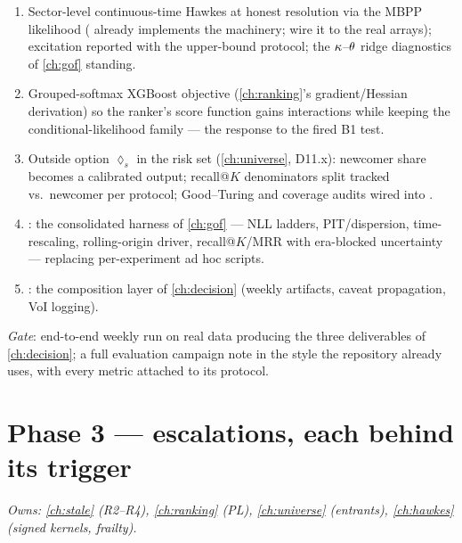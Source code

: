\begin{enumerate}[label=P2.\arabic*,leftmargin=3.2em]
\item Sector-level continuous-time Hawkes at honest resolution via the
MBPP likelihood ( already implements the machinery;
wire it to the real arrays); excitation reported with the
upper-bound protocol; the $\kappa$--$\theta$ ridge diagnostics of
\cref{ch:gof} standing.
\item Grouped-softmax XGBoost objective (\cref{ch:ranking}'s
gradient/Hessian derivation) so the ranker's score function gains
interactions while keeping the conditional-likelihood family --- the
response to the fired B1 test.
\item Outside option $\lozenge_s$ in the risk set (\cref{ch:universe},
D11.x): newcomer share becomes a calibrated output; recall@$K$
denominators split tracked vs.\ newcomer per protocol; Good--Turing and
coverage audits wired into .
\item {}: the consolidated harness of \cref{ch:gof} ---
NLL ladders, PIT/dispersion, time-rescaling, rolling-origin driver,
recall@$K$/MRR with era-blocked uncertainty --- replacing per-experiment
ad hoc scripts.
\item {}: the composition layer of \cref{ch:decision}
(weekly artifacts, caveat propagation, VoI logging).
\end{enumerate}

\emph{Gate}: end-to-end weekly run on real data producing the three
deliverables of \cref{ch:decision}; a full evaluation campaign note in
the style the repository already uses, with every metric attached to
its protocol.

\section{Phase 3 --- escalations, each behind its trigger}\label{ch13:sec:phase3}

\emph{Owns: \cref{ch:stale} (R2--R4), \cref{ch:ranking} (PL),
\cref{ch:universe} (entrants), \cref{ch:hawkes} (signed kernels,
frailty).}

